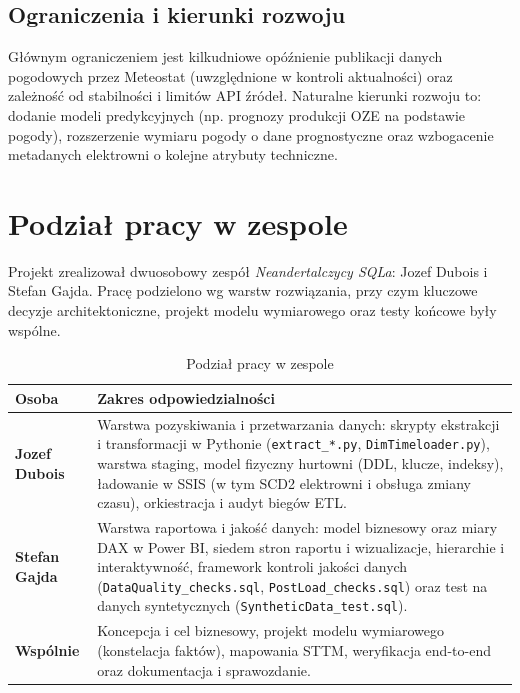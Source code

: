 \documentclass[12pt]{article}
\begin{document}
	\subsection{Ograniczenia i kierunki rozwoju}
	Głównym ograniczeniem jest kilkudniowe opóźnienie publikacji danych pogodowych przez Meteostat (uwzględnione w kontroli aktualności) oraz zależność od stabilności i limitów API źródeł. Naturalne kierunki rozwoju to: dodanie modeli predykcyjnych (np. prognozy produkcji OZE na podstawie pogody), rozszerzenie wymiaru pogody o dane prognostyczne oraz wzbogacenie metadanych elektrowni o kolejne atrybuty techniczne.

	\section{Podział pracy w zespole}

	Projekt zrealizował dwuosobowy zespół \textit{Neandertalczycy SQLa}: Jozef Dubois i Stefan Gajda. Pracę podzielono wg warstw rozwiązania, przy czym kluczowe decyzje architektoniczne, projekt modelu wymiarowego oraz testy końcowe były wspólne.

	\begin{table}[H]
		\centering
		\small
		\begin{tabularx}{\textwidth}{|p{3.6cm}|X|}
			\hline
			\textbf{Osoba} & \textbf{Zakres odpowiedzialności} \\
			\hline
			\textbf{Jozef Dubois} & Warstwa pozyskiwania i przetwarzania danych: skrypty ekstrakcji i transformacji w Pythonie (\texttt{extract\_*.py}, \texttt{DimTimeloader.py}), warstwa staging, model fizyczny hurtowni (DDL, klucze, indeksy), ładowanie w SSIS (w tym SCD2 elektrowni i obsługa zmiany czasu), orkiestracja i audyt biegów ETL. \\
			\hline
			\textbf{Stefan Gajda} & Warstwa raportowa i jakość danych: model biznesowy oraz miary DAX w Power BI, siedem stron raportu i wizualizacje, hierarchie i interaktywność, framework kontroli jakości danych (\texttt{DataQuality\_checks.sql}, \texttt{PostLoad\_checks.sql}) oraz test na danych syntetycznych (\texttt{SyntheticData\_test.sql}). \\
			\hline
			\textbf{Wspólnie} & Koncepcja i cel biznesowy, projekt modelu wymiarowego (konstelacja faktów), mapowania STTM, weryfikacja end-to-end oraz dokumentacja i sprawozdanie. \\
			\hline
		\end{tabularx}
		\caption{Podział pracy w zespole}
	\end{table}
\end{document}
